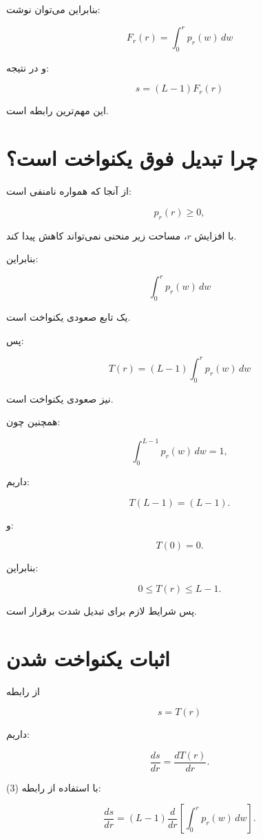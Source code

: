 \documentclass[12pt,a4paper]{article}
\begin{document}
	بنابراین می‌توان نوشت:
	
	\[
	F_r(r)=\int_0^r p_r(w)\,dw
	\]
	
	و در نتیجه:
	
	\[
	\boxed{
		s=(L-1)F_r(r)
	}
	\tag{4}
	\]
	
	این مهم‌ترین رابطه  است.
	
	
	\section{چرا تبدیل فوق یکنواخت است؟}
	
	از آنجا که  همواره نامنفی است:
	
	\[
	p_r(r)\ge 0,
	\]
	
	با افزایش $r$، مساحت زیر منحنی  نمی‌تواند کاهش پیدا کند.
	
	بنابراین:
	
	\[
	\int_0^r p_r(w)\,dw
	\]
	
	یک تابع صعودی یکنواخت است.
	
	پس:
	
	\[
	T(r)
	=
	(L-1)
	\int_0^r p_r(w)\,dw
	\]
	
	نیز صعودی یکنواخت است.
	
	همچنین چون:
	
	\[
	\int_0^{L-1}p_r(w)\,dw=1,
	\]
	
	داریم:
	
	\[
	T(L-1)
	=
	(L-1).
	\]
	
	و:
	
	\[
	T(0)=0.
	\]
	
	بنابراین:
	
	\[
	0\le T(r)\le L-1.
	\]
	
	پس شرایط لازم برای تبدیل شدت برقرار است.
	
	
	\section{اثبات یکنواخت شدن }
	
	از رابطه
	
	\[
	s=T(r)
	\]
	
	داریم:
	
	\[
	\frac{ds}{dr}
	=
	\frac{dT(r)}{dr}.
	\]
	
	با استفاده از رابطه (3):
	
	\[
	\frac{ds}{dr}
	=
	(L-1)
	\frac{d}{dr}
	\left[
	\int_0^r p_r(w)\,dw
	\right].
	\]
	
\end{document}
